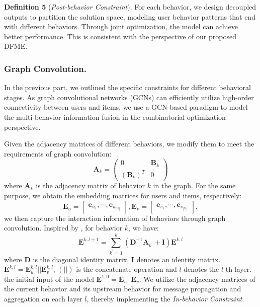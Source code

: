 \textbf{Definition 5} (\textit{Post-behavior Constraint}). For each behavior, we design decoupled outputs to partition the solution space, modeling user behavior patterns that end with different behaviors. Through joint optimization, the model can achieve better performance. This is consistent with the perspective of our proposed DFME.

\subsubsection{Graph Convolution.}
\label{para_inter_enhance}
In the previous part, we outlined the specific constraints for different behavioral stages. As graph convolutional networks (GCNs) can efficiently utilize high-order connectivity between users and items, we use a GCN-based paradigm to model the multi-behavior information fusion in the combinatorial optimization perspective.

Given the adjacency matrices of different behaviors, we modify them to meet the requirements of graph convolution:
\begin{equation}
\mathbf{A}_{k}=\left(\begin{array}{cc}
0 & \mathbf{B}_{k} \\
\left(\mathbf{B}_{k}\right)^{T} & 0
\end{array}\right)
\end{equation}
where $\mathbf{A}_{k}$ is the adjacency matrix of behavior $k$ in the graph. For the same purpose, we obtain the embedding matrices for users and items, respectively:
\begin{equation}
\mathbf{E}_{u}=[\begin{array}{cc}\mathbf{e}_{u_{1}},\cdots,\mathbf{e}_{u_{|\mathrm{U}|}}\end{array}], 
\mathbf{E}_{v}=[\begin{array}{cc}\mathbf{e}_{v_{1}},\cdots,\mathbf{e}_{v_{|\mathrm{V}|}}\end{array}],
\end{equation}
we then capture the interaction information of behaviors through graph convolution. Inspired by \cite{lightgcn,mbgcn}, for behavior $k$, we have:
\begin{equation}
\label{mess_gcn}
\mathbf{E}^{k,l+1}=\sum_{k^{\prime}=1}^{k}(\mathbf{D}^{-1}\mathbf{A}_{k^{\prime}} + \mathbf{I})\mathbf{E}^{k,l}
\end{equation}
where $\mathbf{D}$ is the diagonal identity matrix, $\mathbf{I}$ denotes an identity matrix. $\mathbf{E}^{k,l} = \mathbf{E}_{u}^{k,l}||\mathbf{E}_{v}^{k,l}$, $(||)$ is the concatenate operation and $l$ denotes the $l$-th layer. the initial input of the model $\mathbf{E}^{1,0} = \mathbf{E}_{u}||\mathbf{E}_{v}$. We utilize the adjacency matrices of the current behavior and its upstream behavior for message propagation and aggregation on each layer $l$, thereby implementing the \textit{In-behavior Constraint}.

